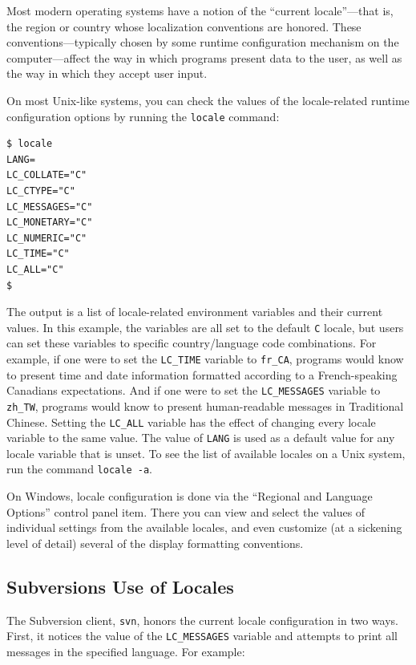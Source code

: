 Most modern operating systems have a notion of the ``current
locale''---that is, the region or country whose localization conventions
are honored. These conventions---typically chosen by some runtime
configuration mechanism on the computer---affect the way in which
programs present data to the user, as well as the way in which they
accept user input.

On most Unix-like systems, you can check the values of the
locale-related runtime configuration options by running the
\texttt{locale} command:

\begin{verbatim}
$ locale
LANG=
LC_COLLATE="C"
LC_CTYPE="C"
LC_MESSAGES="C"
LC_MONETARY="C"
LC_NUMERIC="C"
LC_TIME="C"
LC_ALL="C"
$
\end{verbatim}

The output is a list of locale-related environment variables and their
current values. In this example, the variables are all set to the
default \texttt{C} locale, but users can set these variables to specific
country/language code combinations. For example, if one were to set the
\texttt{LC\_TIME} variable to \texttt{fr\_CA}, programs would know to
present time and date information formatted according to a
French-speaking Canadian\textquotesingle s expectations. And if one were
to set the \texttt{LC\_MESSAGES} variable to \texttt{zh\_TW}, programs
would know to present human-readable messages in Traditional Chinese.
Setting the \texttt{LC\_ALL} variable has the effect of changing every
locale variable to the same value. The value of \texttt{LANG} is used as
a default value for any locale variable that is unset. To see the list
of available locales on a Unix system, run the command
\texttt{locale\ -a}.

On Windows, locale configuration is done via the ``Regional and Language
Options'' control panel item. There you can view and select the values
of individual settings from the available locales, and even customize
(at a sickening level of detail) several of the display formatting
conventions.

\subsection{Subversion\textquotesingle s Use of
Locales}\label{svn.advanced.l10n.svnuse}

The Subversion client, \texttt{svn}, honors the current locale
configuration in two ways. First, it notices the value of the
\texttt{LC\_MESSAGES} variable and attempts to print all messages in the
specified language. For example:


